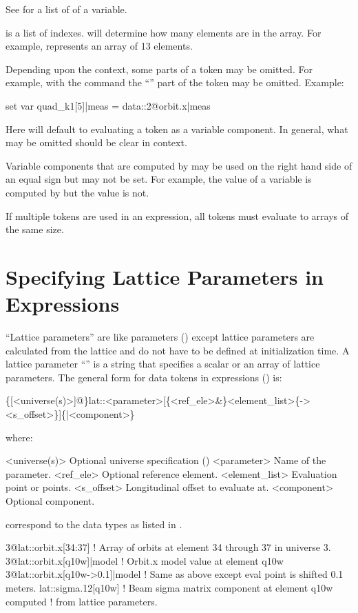 See  for a list of  of a variable.

 is a list of indexes.  will determine how many elements are in
the array. For example,  represents an array of 13 elements.

Depending upon the context, some parts of a token may be omitted. For example, with the  command the ``'' part of the token may be omitted.  Example:
\begin{example}
  set var quad_k1[5]|meas = data::2@orbit.x|meas
\end{example}
Here \tao will default to evaluating a token as a variable component. In general, what may be
omitted should be clear in context.

Variable components that are computed by \tao may be used on the right hand side of an equal sign
but may not be set. For example, the  value of a variable is computed by \tao but the
 value is not.

If multiple tokens are used in an expression, all tokens must evaluate to arrays of the same size.

\section{Specifying Lattice Parameters in Expressions}
\label{s:lat.token}

``Lattice parameters'' are like  parameters () except lattice parameters
are calculated from the lattice and do not have to be defined at initialization time.  A lattice
parameter ``'' is a string that specifies a scalar or an array of lattice parameters. The
general form for data tokens in expressions () is:
\begin{example}
  \{[<universe(s)>]@\}lat::<parameter>[\{<ref_ele>&\}<element_list>\{-><s_offset>\}]\{|<component>\}
\end{example}
where:
\begin{example}
  <universe(s)>       Optional universe specification ()
  <parameter>         Name of the parameter.
  <ref_ele>           Optional reference element.
  <element_list>      Evaluation point or points.
  <s_offset>          Longitudinal offset to evaluate at.
  <component>         Optional component. 
\end{example}
correspond to the data types as listed in . 
\begin{example}
  3@lat::orbit.x[34:37]           ! Array of orbits at element 34 through 37 in universe 3.
  3@lat::orbit.x[q10w]|model      ! Orbit.x model value at element q10w
  3@lat::orbit.x[q10w->0.1]|model ! Same as above except eval point is shifted 0.1 meters.
  lat::sigma.12[q10w]             ! Beam sigma matrix component at element q10w computed 
                                  !  from lattice parameters.
\end{example}

